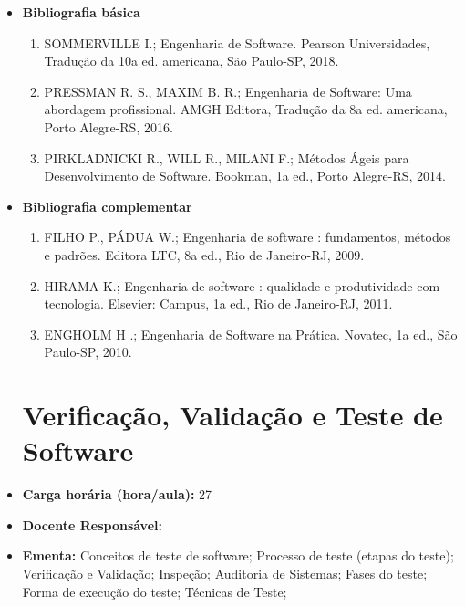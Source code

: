 \documentclass[11pt,fleqn]{book} %
\begin{document}
\begin{itemize}
	\item \textbf{Bibliografia básica}
	\begin{enumerate}
		\item SOMMERVILLE I.; Engenharia de Software. Pearson Universidades, Tradução da 10a ed. americana, São Paulo-SP, 2018.
		\item PRESSMAN R. S., MAXIM B. R.; Engenharia de Software: Uma abordagem profissional. AMGH Editora, Tradução da 8a ed. americana, Porto Alegre-RS, 2016.
		\item PIRKLADNICKI R., WILL R., MILANI F.; Métodos Ágeis para Desenvolvimento de Software. Bookman, 1a ed., Porto Alegre-RS, 2014.
	\end{enumerate}
	\item \textbf{Bibliografia complementar}
	\begin{enumerate}
		\item FILHO P., PÁDUA W.; Engenharia de software : fundamentos, métodos e padrões. Editora LTC, 8a ed., Rio de Janeiro-RJ, 2009.
		\item HIRAMA K.; Engenharia de software : qualidade e produtividade com tecnologia. Elsevier: Campus, 1a ed., Rio de Janeiro-RJ, 2011.
		\item ENGHOLM H .; Engenharia de Software na Prática. Novatec, 1a ed., São Paulo-SP, 2010.
	
	\end{enumerate}

\newpage
\section{Verificação, Validação e Teste de Software}\label{disc:engenharia_de_requisitos}
	
	\item \textbf{Carga horária (hora/aula):} 27
	\item \textbf{Docente Responsável:}~
	\item \textbf{Ementa:} 
    Conceitos de teste de software;
    Processo de teste (etapas do teste);
    Verificação e Validação;
    Inspeção;
	Auditoria de Sistemas;
	Fases do teste;
	Forma de execução do teste;
	Técnicas de Teste;
	

\end{itemize}
\end{document}
